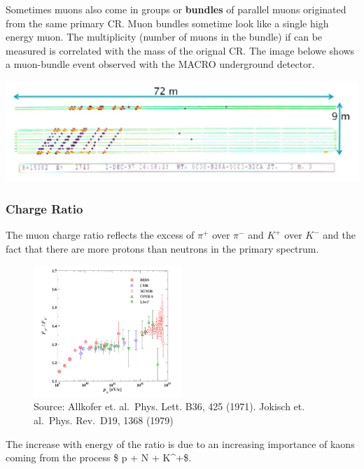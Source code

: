 \documentclass[
  letterpaper,
  DIV=11,
  numbers=noendperiod]{scrreprt}
\begin{document}
Sometimes muons also come in groups or \textbf{bundles} of parallel
muons originated from the same primary CR. Muon bundles sometime look
like a single high energy muon. The multiplicity (number of muons in the
bundle) if can be measured is correlated with the mass of the orignal
CR. The image belowe shows a muon-bundle event observed with the MACRO
underground detector.

\includegraphics{images/macro-bundle.png}

\subsubsection*{Charge Ratio}\label{charge-ratio}

The muon charge ratio reflects the excess of \(\pi^+\) over \(\pi^-\)
and \(K^+\) over \(K^-\) and the fact that there are more protons than
neutrons in the primary spectrum.

\begin{figure}[H]

{\centering \includegraphics[width=0.5\textwidth,height=\textheight]{images/muon_ratio.png}

}

\caption{Source: Allkofer et. al.~Phys. Lett. B36, 425 (1971). Jokisch
et. al.~Phys. Rev.~D19, 1368 (1979)}

\end{figure}%

The increase with energy of the ratio is due to an increasing importance
of kaons coming from the process \$ p + N \rightarrow \Lambda +
K\^{}+\$.
\end{document}
